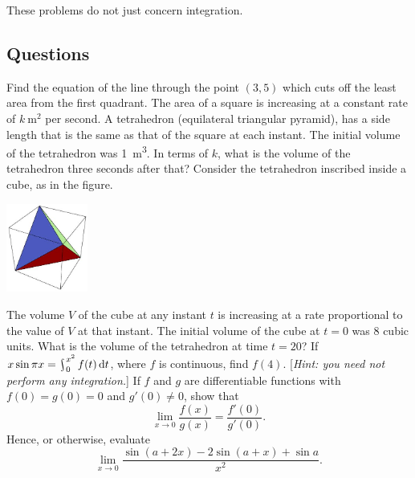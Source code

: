 


These problems do not just concern integration.
\subsection*{Questions}
\begin{questions}
  \questioE Find the equation of the line through the point $ (3,5) $ which cuts off the least area from the first quadrant.
  \questioE The area of a square is increasing at a constant rate of $ k~\si{\metre\squared} $ per second. A tetrahedron (equilateral triangular pyramid),
            has a side length that is the same as that of the square at each instant. The initial volume of the tetrahedron was \SI{1}{\metre\cubed}.
            In terms of $ k $, what is the volume of the tetrahedron three seconds after that?
  \questioS Consider the tetrahedron inscribed inside a cube, as in the figure.
            \begin{center}
              \includegraphics[width=0.2\textwidth]{tetrahedron}
            \end{center}
            The volume $ V $ of the cube at any instant $ t $ is increasing at a rate proportional to the value of $ V $ at that instant. The
            initial volume of the cube at $ t = 0 $ was 8 cubic units. What is the volume of the tetrahedron at time $ t = 20 $?
  \questioS If $ x \sin \pi x = \rint^{x^2}_0 f(t) \dif{t} $, where $ f $ is continuous, find $ f(4) $. [\textit{Hint: you need not perform any integration.}]
  \questioS If $ f $ and $ g $ are differentiable functions with $ f(0) = g(0) = 0 $ and $ g'(0) \neq 0 $, show that
            \begin{displaymath}
              \lim_{x \to 0} \frac{f(x)}{g(x)} = \frac{f'(0)}{g'(0)}.
            \end{displaymath}
            Hence, or otherwise, evaluate
            \begin{displaymath}
              \lim_{x \to 0} \frac{\sin(a + 2x) - 2\sin(a + x) + \sin a}{x^2}.
            \end{displaymath}
  \question
    \begin{parts}

\end{parts}
\end{questions}
